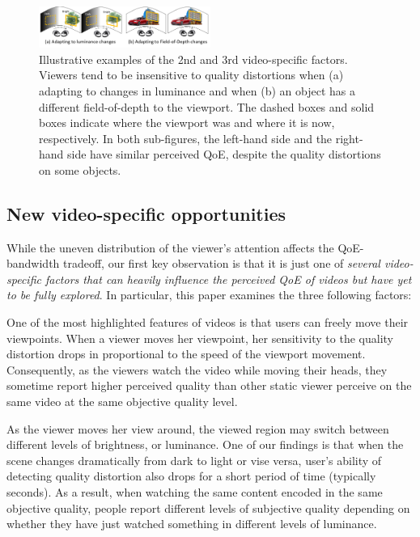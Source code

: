 \begin{figure}[t!]
  \centering
  \includegraphics[width=0.5\textwidth]{figures/example-luminance-fov.pdf}
  \caption{Illustrative examples of the 2nd and 3rd \vr video-specific factors. 
  Viewers tend to be insensitive to quality distortions when (a) adapting to changes in luminance and when (b) an object has a different field-of-depth to the viewport.
  The dashed boxes and solid boxes indicate where the viewport was and where it is now, respectively.
  In both sub-figures, the left-hand side and the right-hand side have similar perceived QoE, despite the quality distortions on some objects.}
  \label{fig:luminance}
  \end{figure}

\subsection{New \vr video-specific opportunities}
\label{subsec:opportunities}

While the uneven distribution of the viewer's attention affects the QoE-bandwidth tradeoff, our first key observation is that it is just one of {\em several \vr video-specific factors that can heavily influence the perceived QoE of \vr videos but have yet to be fully explored}. 
In particular, this paper examines the three following factors:


One of the most highlighted features of \vr videos is that users can freely move their viewpoints. 
When a viewer moves her viewpoint, her sensitivity to the quality distortion drops in proportional to the speed of the viewport movement.
Consequently, as the viewers watch the video while moving their heads, they sometime report higher perceived quality than other static viewer perceive on the same video at the same objective quality level.


As the viewer moves her view around, the viewed region may switch between different levels of brightness, or luminance. 
One of our findings is that when the scene changes dramatically from dark to light or vise versa, user's ability of detecting quality distortion also drops for a short period of time (typically \fillme seconds).
As a result, when watching the same content encoded in the same objective quality, people report different levels of subjective quality depending on whether they have just watched something in different levels of luminance.


